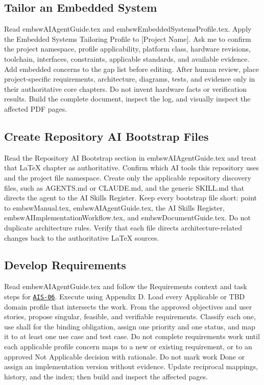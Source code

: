 \subsection{Tailor an Embedded System}
\begingroup\ttfamily\raggedright
\noindent Read embswAIAgentGuide.tex and embswEmbeddedSystemsProfile.tex. Apply the Embedded Systems Tailoring Profile to [Project Name]. Ask me to confirm the project namespace, profile applicability, platform class, hardware revisions, toolchain, interfaces, constraints, applicable standards, and available evidence. Add embedded concerns to the gap list before editing. After human review, place project-specific requirements, architecture, diagrams, tests, and evidence only in their authoritative core chapters. Do not invent hardware facts or verification results. Build the complete document, inspect the log, and visually inspect the affected PDF pages.\par
\endgroup


\subsection{Create Repository AI Bootstrap Files}
\begingroup\ttfamily\raggedright
\noindent Read the Repository AI Bootstrap section in embswAIAgentGuide.tex and treat that LaTeX chapter as authoritative. Confirm which AI tools this repository uses and the project file namespace. Create only the applicable repository discovery files, such as AGENTS.md or CLAUDE.md, and the generic SKILL.md that directs the agent to the AI Skills Register. Keep every bootstrap file short: point to embswManual.tex, embswAIAgentGuide.tex, the AI Skills Register, embswAIImplementationWorkflow.tex, and embswDocumentGuide.tex. Do not duplicate architecture rules. Verify that each file directs architecture-related changes back to the authoritative LaTeX sources.\par
\endgroup


\subsection{Develop Requirements}
\begingroup\ttfamily\raggedright
\noindent Read embswAIAgentGuide.tex and follow the Requirements context and task steps for \hyperref[Skill:AIS-06]{\texttt{AIS-06}}. Execute using Appendix D. Load every Applicable or TBD domain profile that intersects the work. From the approved objectives and user stories, propose singular, feasible, and verifiable requirements. Classify each one, use shall for the binding obligation, assign one priority and one status, and map it to at least one use case and test case. Do not complete requirements work until each applicable profile concern maps to a new or existing requirement, or to an approved Not Applicable decision with rationale. Do not mark work Done or assign an implementation version without evidence. Update reciprocal mappings, history, and the index; then build and inspect the affected pages.\par
\endgroup


